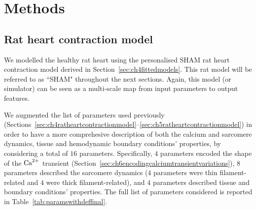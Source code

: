 %
%
%
\section{Methods}\label{sec:ch7methods}


%
%
%
\subsection{Rat heart contraction model}\label{sec:ratmodel}
We modelled the healthy rat heart using the personalised SHAM rat heart contraction model derived in Section~\ref{sec:ch4fittedmodels}. This rat model will be referred to as ``SHAM" throughout the next sections. Again, this model (or simulator) can be seen as a multi-scale map from input parameters to output features.

\vspace{0.2cm}
We augmented the list of parameters used previously (Sections~\ref{sec:ch4ratheartcontractionmodel}--\ref{sec:ch5ratheartcontractionmodel}) in order to have a more comprehesive description of both the calcium and sarcomere dynamics, tissue and hemodynamic boundary conditions' properties, by considering a total of $16$ parameters. Specifically, $4$ parameters encoded the shape of the $\textrm{Ca}^{2+}$ transient (Section~\ref{sec:ch6encodingcalciumtransientvariations}), $8$ parameters described the sarcomere dynamics ($4$ parameters were thin filament-related and $4$ were thick filament-related), and $4$ parameters described tissue and boundary conditions' properties. The full list of parameters considered is reported in Table~\ref{tab:paramswithdeffinal}.

